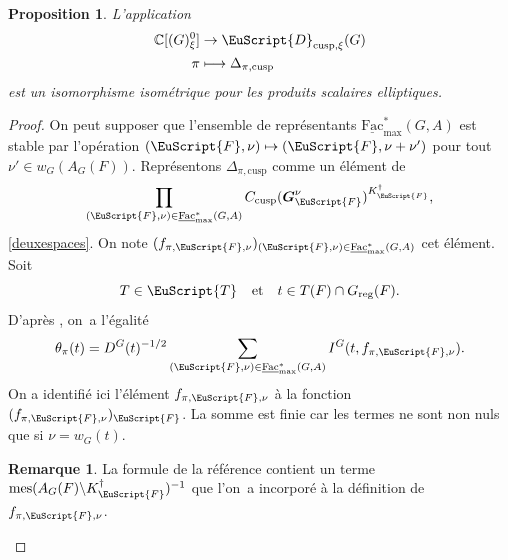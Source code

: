 \documentclass[JEP,XML,SOM,Unicode,francais]{cedram}
\let\mathcal \EuScript
\newcommand{\NoChangel}[1]{%
\expandafter\let\csname old\string#1\endcsname=#1
\let#1=\relax
\newcommand{#1}{\mathcode`l="716C\csname old\string#1\endcsname\mathcode`l="7160 }%
}
\newcommand{\quadet}{\quad\text{et}\quad}
\newcommand\mto{\mathchoice{\longmapsto}{\mapsto}{\mapsto}{\mapsto}}
\newcommand{\cusp}{\mathrm{cusp}}
\newcommand{\rell}{\mathrm{ell}} \NoChangel{\rell}
\newcommand{\Ell}{\mathrm{Ell}} \NoChangel{\Ell}
\newcommand{\Fac}{\mathrm{Fac}}
\newcommand{\reg}{\mathrm{reg}}
\DeclareMathOperator{\mes}{mes}
\newcommand{\bG}{\boldsymbol{G}}
\newcommand{\cD}{\mathcal{D}}
\newcommand{\cF}{\mathcal{F}}
\newcommand{\cT}{\mathcal{T}}
\newcommand{\CC}{\mathbb{C}}
\theoremstyle{plain}
\newtheorem*{prop*}{Proposition}
\theoremstyle{definition}
\newtheorem*{rem*}{Remarque}
\begin{document}
\begin{prop*}
L'application
\begin{align*}
\CC[\Ell(G)_{\xi}^0]&\to \cD_{\cusp,\xi}(G)\\
\pi&\mto \Delta_{\pi,\cusp}
\end{align*}
est un isomorphisme isométrique pour les produits scalaires elliptiques.
\end{prop*}

\begin{proof}
On peut supposer que l'ensemble de représentants $\underline{\Fac}^*_{\max}(G,A)$ est stable par l'opération $(\cF,\nu)\mto (\cF,\nu+\nu')$ pour tout $\nu'\in w_{G}(A_{G}(F))$. Représentons $\Delta_{\pi,\cusp}$ comme un élément de
\[
\prod_{(\cF,\nu)\in \underline{\Fac}^*_{\max}(G,A)}C_{\cusp}(\bG_{\cF}^{\nu})^{K_{\cF}^{\dag}},
\]
\cf \ref{deuxespaces}. On note $(f_{\pi,\cF,\nu})_{(\cF,\nu)\in \underline{\Fac}^*_{\max}(G,A)}$ cet élément.
Soit
\[
T\in \cT_{\rell}\quadet t\in T(F)\cap G_{\reg}(F).
\]
D'après \cite[18(3)]{W2}, on~a l'égalité
\[
\theta_{\pi}(t)=D^G(t)^{-1/2}\sum_{(\cF,\nu)\in \underline{\Fac}^*_{\max}(G,A)} I^G(t,f_{\pi,\cF,\nu}).
\]
On a identifié ici l'élément $f_{\pi,\cF,\nu}$ à la fonction $(f_{\pi,\cF,\nu})_{\cF}$. La somme est finie car les termes ne sont non nuls que si $\nu=w_{G}(t)$.

\begin{rem*}
La formule de la référence contient un terme $\mes(A_{G}(F)\backslash K_{\cF}^{\dag})^{-1}$ que l'on~a incorporé à la définition de $f_{\pi,\cF,\nu}$.
\end{rem*}


\end{proof}
\end{document}
